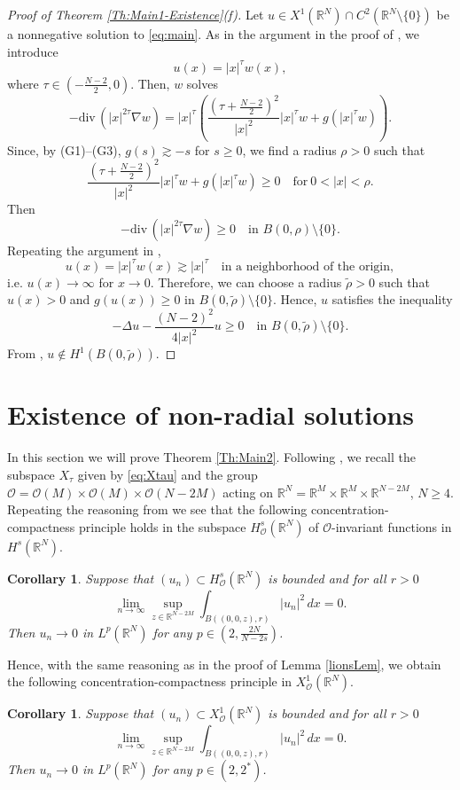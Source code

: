 \documentclass[12pt,leqno,twoside,sort]{amsart}
\newtheorem{Cor}[Th]{Corollary}
\newcommand{\R}{\mathbb{R}}
\newcommand{\cO}{{\mathcal O}}
\renewcommand{\div}{\mathrm{div}\,}
\numberwithin{equation}{section}
\begin{document}
\begin{proof}[{Proof of Theorem \ref{Th:Main1-Existence}(f)}]
Let $u \in X^1 (\R^N) \cap C^2 (\R^N \setminus \{0\})$ be a nonnegative solution to \eqref{eq:main}. As in the argument in the proof of \cite[Theorem 1.1(iv)]{LiLiTang}, we introduce
$$
u(x) = |x|^\tau w(x),
$$
where $\tau\in\left(-\frac{N-2}2,0\right)$. Then, $w$ solves
$$
- \div \left( |x|^{2\tau} \nabla w \right) = |x|^\tau \left( \frac{\left(\tau + \frac{N-2}{2} \right)^2}{|x|^2} |x|^\tau w + g(|x|^\tau w) \right).
$$
Since, by (G1)--(G3), $g(s) \gtrsim -s$ for $s \geq 0$, we find a radius $\rho > 0$ such that
$$
\frac{\left(\tau + \frac{N-2}{2} \right)^2}{|x|^2} |x|^\tau w + g(|x|^\tau w)  \geq 0 \quad \mbox{for} \ 0 < |x| < \rho. 
$$
Then
$$
- \div \left( |x|^{2\tau} \nabla w \right) \geq 0 \quad \mbox{in } B(0,\rho) \setminus \{0\}.
$$
Repeating the argument in \cite{LiLiTang}, 
$$
u(x) = |x|^\tau w(x) \gtrsim |x|^\tau \quad \mbox{in a neighborhood of the origin},
$$
i.e. $u(x)\to \infty$ for $x\to 0$. Therefore, we can choose a radius $\widetilde{\rho} > 0$ such that $u(x) > 0$ and $g(u(x)) \geq 0$ in $B(0,\widetilde{\rho}) \setminus \{0\}$. Hence, $u$ satisfies the inequality
$$
-\Delta u - \frac{(N-2)^2}{4 |x|^2} u \geq 0 \quad \mbox{in } B(0,\widetilde{\rho}) \setminus \{0\}.
$$
From \cite[Proposition 2.1]{Smets}, $u \not\in H^1 (B(0,\widetilde{\rho}))$.
\end{proof}



\section{Existence of non-radial solutions}\label{sect:7}

In this section we will prove Theorem \ref{Th:Main2}. Following \cite{MR4173560}, we recall the subspace $X_\tau$ given by \eqref{eq:Xtau} and the group $\mathcal{O} = \mathcal{O}(M) \times \mathcal{O}(M) \times \mathcal{O}(N-2M)$ acting on $\R^N = \R^M \times \R^M \times \R^{N-2M}$, $N \geq 4$. Repeating the reasoning from \cite[Corollary 3.2]{MR4173560} we see that the following concentration-compactness principle holds in the subspace $H^s_\mathcal{O} (\R^N)$ of $\cO$-invariant functions in $H^s (\R^N)$.

\begin{Cor}
Suppose that $(u_n) \subset H^s_\mathcal{O} (\R^N)$ is bounded and for all $r > 0$
$$
\lim_{n\to\infty} \sup_{z \in \R^{N-2M}} \int_{B((0,0,z),r)} |u_n|^2 \, dx = 0.
$$
Then $u_n \to 0$ in $L^p (\R^N)$ for any $p \in \left(2, \frac{2N}{N-2s} \right)$.
\end{Cor}
Hence, with the same reasoning as in the proof of Lemma \ref{lionsLem}, we obtain the following concentration-compactness principle in $X^1_\mathcal{O} (\R^N)$.
\begin{Cor}\label{lionsLemWithSymmetry}
Suppose that $(u_n) \subset X^1_\mathcal{O} (\R^N)$ is bounded and for all $r > 0$
$$
\lim_{n\to\infty} \sup_{z \in \R^{N-2M}} \int_{B((0,0,z),r)} |u_n|^2 \, dx = 0.
$$
Then $u_n \to 0$ in $L^p (\R^N)$ for any $p \in \left(2, 2^* \right)$.
\end{Cor}
\end{document}
